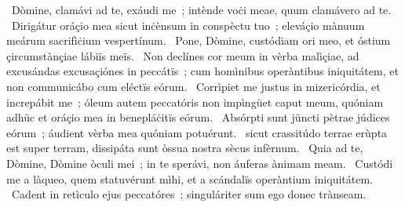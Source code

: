 ~Dòmine, clamávi ad te, exáudi me~; intènde voċi meae, quum clamávero ad te. 
~Dirigátur oráçio mea sicut inċènsum in conspèctu tuo~; eleváçio mànuum meárum sacrifìċium vespertínum. 
~Pone, Dòmine, custódiam ori meo, et óstium çircumstànçiae lábiïs meïs. 
~Non declínes cor meum in vèrba malìçiae, ad excusándas excusaçiónes in peccátïs~; cum homìnibus operàntibus iniquitátem, et non communicábo cum eléctïs eórum. 
~Corrìpiet me justus in mizericórdia, et increpábit me~; óleum autem peccatóris non impìngüet caput meum, quóniam adhüc et oráçio mea in benepláċitïs eórum. 
~Absórpti sunt jüncti pètrae júdices eórum~; áudient vèrba mea quóniam potuérunt. 
~sicut crassitúdo terrae erùpta est super terram, dissipáta sunt òssua nostra sècus infèrnum. 
~Quia ad te, Dòmine, Dòmine òculi mei~; in te sperávi, non áuferas ànimam meam. 
~Custódi me a làqueo, quem statuvérunt mìhi, et a scándalïs operàntium iniquitátem. 
~Cadent in retìculo ejus peccatóres~; singuláriter sum ego donec trànseam. 
